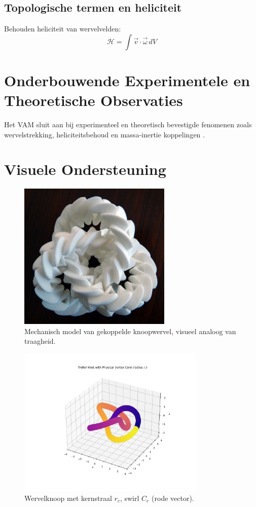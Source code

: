 \documentclass{article}
\begin{document}
    \subsection{Topologische termen en heliciteit}
    Behouden heliciteit van wervelvelden:
    \[
        \mathcal{H} = \int \vec{v}\cdot\vec{\omega}\, dV
    \]

    \section{Onderbouwende Experimentele en Theoretische Observaties}
    Het VAM sluit aan bij experimenteel en theoretisch bevestigde fenomenen zoals wervelstrekking, heliciteitsbehoud en massa-inertie koppelingen \cite{batchelor1953,vinen2002,bewley2008,moffatt1969,kleckner2013,scheeler2014,bartlett1986}.

    \section{Visuele Ondersteuning}

    \begin{figure}[h!]
        \centering
        \includegraphics[width=0.65\textwidth]{mechanic trefoil}
        \caption{Mechanisch model van gekoppelde knoopwervel, visueel analoog van traagheid.}
    \end{figure}

    \begin{figure}[h!]
        \centering
        \includegraphics[width=0.8\textwidth]{FatTreFoil.png}
        \caption{Wervelknoop met kernstraal $r_c$, swirl $C_e$ (rode vector).}
    \end{figure}
\end{document}
